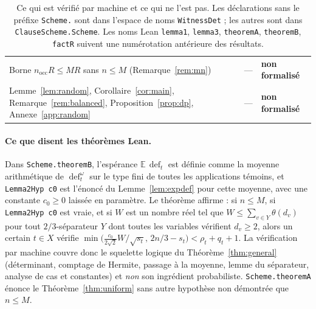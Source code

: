 \documentclass[11pt,a4paper]{article}
\theoremstyle{definition}
\theoremstyle{remark}
\newcommand{\E}{\mathbb{E}}
\newcommand{\dfc}{\operatorname{def}}
\newcommand{\nocc}{n_{\mathrm{occ}}}
\begin{document}
\begin{table}[tb]
\begin{tabular}{@{}>{\raggedright\arraybackslash}p{3.6cm}>{\raggedright\arraybackslash}p{6.1cm}>{\raggedright\arraybackslash}p{4.9cm}@{}}
Borne $\nocc R\le MR$ sans $n\le M$ (Remarque~\ref{rem:mn}) & --- & \textbf{non formalisé}\\[2pt]
Lemme~\ref{lem:random}, Corollaire~\ref{cor:main}, Remarque~\ref{rem:balanced}, Proposition~\ref{prop:dp}, Annexe~\ref{app:random} & --- & \textbf{non formalisé}\\
\bottomrule
\end{tabular}
\caption{Ce qui est vérifié par machine et ce qui ne l'est pas. Les déclarations sans le
préfixe \texttt{Scheme.} sont dans l'espace de noms \texttt{WitnessDet} ; les autres sont
dans \texttt{ClauseScheme.Scheme}. Les noms Lean \texttt{lemma1}, \texttt{lemma3},
\texttt{theoremA}, \texttt{theoremB}, \texttt{factR} suivent une numérotation antérieure des
résultats.}\label{tab:lean}
\end{table}


\paragraph{Ce que disent les théorèmes Lean.} Dans \texttt{Scheme.theoremB}, l'espérance
$\E\,\dfc_t$ est définie comme la moyenne arithmétique de $\dfc^\omega_t$ sur le type fini
de toutes les applications témoins, et \texttt{Lemma2Hyp c0} est l'énoncé du
Lemme~\ref{lem:expdef} pour cette moyenne, avec une constante $c_0\ge0$ laissée en
paramètre. Le théorème affirme : si $n\le M$, si \texttt{Lemma2Hyp c0} est vraie, et si $W$
est un nombre réel tel que $W\le\sum_{v\in Y}\theta(d_v)$ pour tout $2/3$-séparateur $Y$
dont toutes les variables vérifient $d_v\ge2$, alors un certain $t\in X$ vérifie
$\min\bigl(\frac{c_0}{2\sqrt2}W/\sqrt{s_t},\,2n/3-s_t\bigr)<\rho_t+q_t+1$. La vérification
par machine couvre donc le squelette logique du Théorème~\ref{thm:general} (déterminant,
comptage de Hermite, passage à la moyenne, lemme du séparateur, analyse de cas et
constantes) et \emph{non} son ingrédient probabiliste. \texttt{Scheme.theoremA} énonce le
Théorème~\ref{thm:uniform} sans autre hypothèse non démontrée que $n\le M$.
\end{document}
